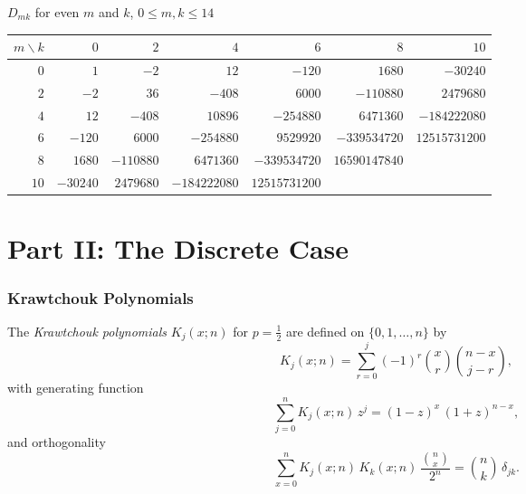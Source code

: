 \documentclass[11pt,a4paper]{article}
\theoremstyle{plain}
\theoremstyle{definition}
\begin{document}
\begin{tcolorbox}[colback=black!5, colframe=black!5, boxrule=0pt,
  sharp corners]
\begin{center}
$D_{mk}$ for even $m$ and $k$, $0 \le m,k \le 14$

\medskip
\scriptsize
\setlength{\tabcolsep}{3pt}
\begin{tabular}{r|rrrrrr}
$m \!\backslash\! k$ & $0$ & $2$ & $4$ & $6$ & $8$ & $10$ \\
\hline
$0$ & $1$ & $-2$ & $12$ & $-120$ & $1680$ & $-30240$ \\
$2$ & $-2$ & $36$ & $-408$ & $6000$ & $-110880$ & $2479680$ \\
$4$ & $12$ & $-408$ & $10896$ & $-254880$ & $6471360$ & $-184222080$ \\
$6$ & $-120$ & $6000$ & $-254880$ & $9529920$ & $-339534720$ & $12515731200$ \\
$8$ & $1680$ & $-110880$ & $6471360$ & $-339534720$ & $16590147840$ \\
$10$ & $-30240$ & $2479680$ & $-184222080$ & $12515731200$ \\
\end{tabular}
\end{center}
\end{tcolorbox}


\part*{Part II: The Discrete Case}

\section{Krawtchouk Polynomials}

The \emph{Krawtchouk polynomials} $K_j(x; n)$ for $p = \tfrac12$
are defined on $\{0, 1, \ldots, n\}$ by
\begin{equation}\label{eq:kraw-def}
  K_j(x; n) = \sum_{r=0}^{j} (-1)^r \binom{x}{r}
  \binom{n-x}{j-r},
\end{equation}
with generating function
\begin{equation}\label{eq:kraw-gf}
  \sum_{j=0}^{n} K_j(x; n)\, z^j = (1-z)^x\, (1+z)^{n-x},
\end{equation}
and orthogonality
\begin{equation}\label{eq:kraw-orth}
  \sum_{x=0}^{n} K_j(x; n)\, K_k(x; n)\, \frac{\binom{n}{x}}{2^n}
  = \binom{n}{k}\, \delta_{jk}.
\end{equation}
\end{document}
